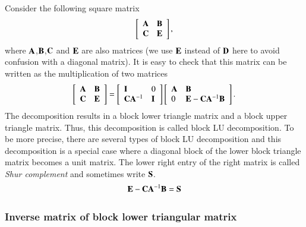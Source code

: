 Consider the following square matrix
%
\begin{eqnarray}
\left[\begin{array}{ll}
\mathbf{A} & \mathbf{B}\\
\mathbf{C} & \mathbf{E}
\end{array}\right],
\end{eqnarray}
%
where $\mathbf{A}$,$\mathbf{B}$,$\mathbf{C}$ and $\mathbf{E}$ are also matrices (we use $\mathbf{E}$ instead of $\mathbf{D}$ here to avoid confusion with a diagonal matrix).
%
It is easy to check that this matrix can be written as the multiplication of two matrices
%
\begin{eqnarray}
\left[\begin{array}{ll}
\mathbf{A} & \mathbf{B}\\
\mathbf{C} & \mathbf{E}
\end{array}\right]
=
\left[\begin{array}{ll}
\mathbf{I} & 0\\
\mathbf{C}\mathbf{A}^{-1} & \mathbf{I}
\end{array}\right]
\left[\begin{array}{ll}
\mathbf{A} & \mathbf{B}\\
0 & \mathbf{E} - \mathbf{C}\mathbf{A}^{-1}\mathbf{B}
\end{array}\right].
\end{eqnarray}
%
The decomposition results in a block lower triangle matrix and a block upper triangle matrix.
%
Thus, this decomposition is called block LU decomposition.
%
To be more precise, there are several types of block LU decomposition and this decomposition is a special case where a diagonal block of the lower block triangle matrix becomes a unit matrix.
%
The lower right entry of  the right matrix is called \emph{Shur complement} and sometimes write $\mathbf{S}$.
%
\begin{equation}
\mathbf{E} - \mathbf{C}\mathbf{A}^{-1}\mathbf{B} = \mathbf{S}
\end{equation}
%


\subsubsection{Inverse matrix of block lower triangular matrix}

